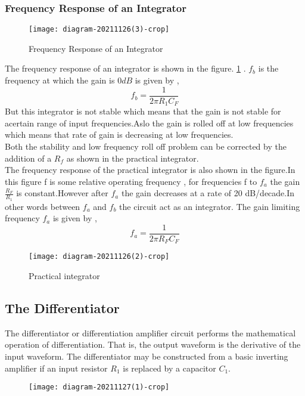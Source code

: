    \subsubsection{Frequency Response of an Integrator}
   \begin{figure}[H]
   	\centering
   	\texttt{[image: diagram-20211126(3)-crop]}
   	\caption{Frequency Response of an Integrator}
   	\label{Frequency Response of an Integrator}
   \end{figure}
   The frequency response of an integrator is shown in the figure.	\ref{Frequency Response of an Integrator} . $f_b$ is the frequency at which the gain is $0dB$ is given by ,
   \begin{equation}
   f_b=\frac{1}{2 \pi R_1C_F}
   \end{equation}
   But this integrator is not stable which means that the gain is not stable for acertain range of input frequencies.Aslo the gain is  rolled off at low frequencies which means that rate of gain is decreasing at low frequencies.\\
   Both the stability and low frequency roll off problem can be corrected by the addition of a $R_f$ as shown in the practical integrator.\\
   The frequency response of the practical integrator is also shown in the figure.In this figure f is some relative operating frequency , for frequencies f to $f_a$ the gain $\frac{R_F}{R_1}$ is constant.However after $f_a$ the gain decreases at a rate of 20 dB/decade.In other words between $f_a$ and $f_b$ the circuit act as an integrator. The gain limiting frequency $f_a$ is given by ,
   $$f_a=\frac{1}{2 \pi R_F C_F}$$
   \begin{figure}[H]
   	\centering
   	\texttt{[image: diagram-20211126(2)-crop]}
   	\caption{Practical integrator}
   	\label{}
   \end{figure}
   \subsection{The Differentiator}
   The differentiator or differentiation amplifier circuit performs the mathematical operation of differentiation. That is, the output waveform is the derivative of the input waveform. The differentiator may be constructed from a basic inverting amplifier if an input resistor $R_{1}$ is replaced by a capacitor $C_{1}$.
   \begin{figure}[H]
   	\centering
   	\texttt{[image: diagram-20211127(1)-crop]}
   	\caption{}
   	\label{}
   \end{figure}
   
